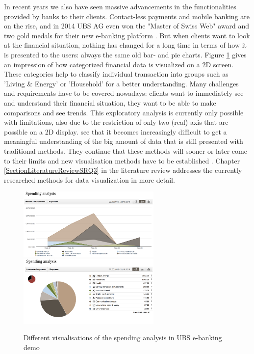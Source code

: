 In recent years we also have seen massive advancements in the functionalities provided by banks to their clients. Contact-less payments and mobile banking are on the rise, and in 2014 UBS AG even won the "Master of Swiss Web" award and two gold medals for their new e-banking platform \citep{UBSAG2014}. But when clients want to look at the financial situation, nothing has changed for a long time in terms of how it is presented to the users: always the same old bar- and pie charts. Figure \ref{fig:ubsspendinganalysis} gives an impression of how categorized financial data is visualized on a 2D screen. These categories help to classify individual transaction into groups such as 'Living \& Energy' or 'Household' for a better understanding. Many challenges and requirements have to be covered nowadays: clients want to immediately see and understand their financial situation, they want to be able to make comparisons and see trends. This exploratory analysis is currently only possible with limitations, also due to the restriction of only two (real) axis that are possible on a 2D display. \cite{Jamieson2007} see that it becomes increasingly difficult to get a meaningful understanding of the big amount of data that is still presented with traditional methods. They continue that these methods will sooner or later come to their limits and new visualisation methods have to be established \citep{Jamieson2007}. Chapter \ref{SectionLiteratureReviewSRQ3} in the literature review addresses the currently researched methods for data visualization in more detail.
\begin{figure}[b]
	\begin{center}
		\includegraphics[width=7cm]{03_Figures/06_Introduction/UBSAG2016_SpendingAnalysis2.png}
		\includegraphics[width=7cm]{03_Figures/06_Introduction/UBSAG2016_SpendingAnalysis.png}
		\caption[Different visualisations of the spending analysis in UBS e-banking demo]{Different visualisations of the spending analysis in UBS e-banking demo \citep{UBSAG2016}}
		\label{fig:ubsspendinganalysis}
	\end{center}
\end{figure}

